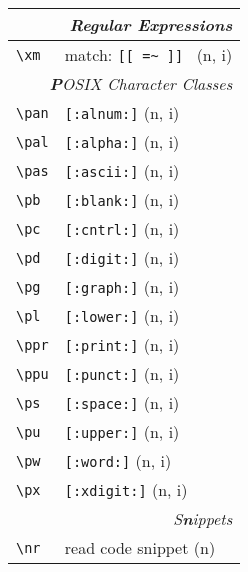 \documentclass[oneside,11pt,a4paper,DIV18]{scrartcl}
\begin{document}
\begin{center}
\newpage 
\begin{tabular}[]{|p{11mm}|p{59mm}|}
\hline
\multicolumn{2}{|r|}{\textsl{Regular E\textbf{x}pressions}}\\
\hline \verb'\xm' & match: \verb'[[ =~ ]] '         \hfill (n, i)\\
\hline
\hline
\multicolumn{2}{|r|}{\textsl{\textbf{P}OSIX Character Classes}}\\
\hline \verb'\pan' &  \verb'[:alnum:]'         \hfill (n, i)\\
\hline \verb'\pal' &  \verb'[:alpha:]'         \hfill (n, i)\\
\hline \verb'\pas' &  \verb'[:ascii:]'         \hfill (n, i)\\
\hline \verb'\pb'  &  \verb'[:blank:]'         \hfill (n, i)\\
\hline \verb'\pc'  &  \verb'[:cntrl:]'         \hfill (n, i)\\
\hline \verb'\pd'  &  \verb'[:digit:]'         \hfill (n, i)\\
\hline \verb'\pg'  &  \verb'[:graph:]'         \hfill (n, i)\\
\hline \verb'\pl'  &  \verb'[:lower:]'         \hfill (n, i)\\
\hline \verb'\ppr' &  \verb'[:print:]'         \hfill (n, i)\\
\hline \verb'\ppu' &  \verb'[:punct:]'         \hfill (n, i)\\
\hline \verb'\ps'  &  \verb'[:space:]'         \hfill (n, i)\\
\hline \verb'\pu'  &  \verb'[:upper:]'         \hfill (n, i)\\
\hline \verb'\pw'  &  \verb'[:word:]'          \hfill (n, i)\\
\hline \verb'\px'  &  \verb'[:xdigit:]'        \hfill (n, i)\\
\hline
\hline
\multicolumn{2}{|r|}{\textsl{S\textbf{n}ippets}}\\
\hline \verb'\nr'  & read code snippet          \hfill (n)\\

\end{tabular}
\end{center}
\end{document}
